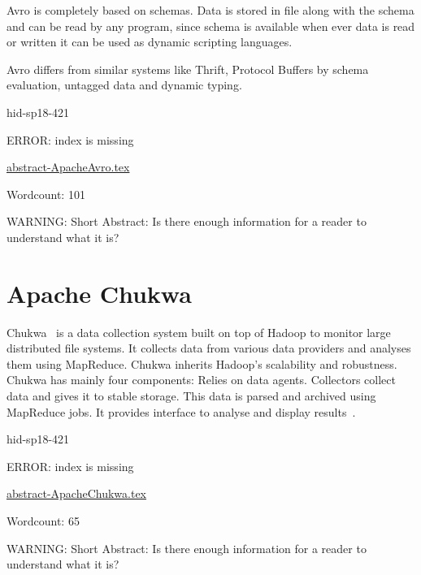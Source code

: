 Avro is completely based on schemas. Data is stored in file along with the
schema and can be read by any program, since schema is available when ever data
is read or written it can be used as dynamic scripting languages.

Avro differs from similar systems like Thrift, Protocol Buffers by schema
evaluation, untagged data and dynamic typing.



\begin{IU}

hid-sp18-421

ERROR: index is missing

\href{https://github.com/cloudmesh-community/hid-sp18-421/blob/master//technology/abstract-ApacheAvro.tex}{abstract-ApacheAvro.tex}

 

Wordcount: 101

WARNING: Short Abstract: Is there enough information for a reader to understand what it is?

\end{IU}

\section{Apache Chukwa}

Chukwa~\cite{hid-sp-421-ChukwaCloud} is a data collection system built on top of
Hadoop to monitor large distributed file systems. It collects data from various
data providers and analyses them using MapReduce. Chukwa inherits Hadoop’s
scalability and robustness. Chukwa has mainly four components: Relies on data
agents. Collectors collect data and gives it to stable storage. This data is
parsed and archived using MapReduce jobs. It provides interface to analyse and
display results~\cite{hid-sp-421-ChukwaComponents}.




\begin{IU}

hid-sp18-421

ERROR: index is missing

\href{https://github.com/cloudmesh-community/hid-sp18-421/blob/master//technology/abstract-ApacheChukwa.tex}{abstract-ApacheChukwa.tex}

 

Wordcount: 65

WARNING: Short Abstract: Is there enough information for a reader to understand what it is?

\end{IU}

